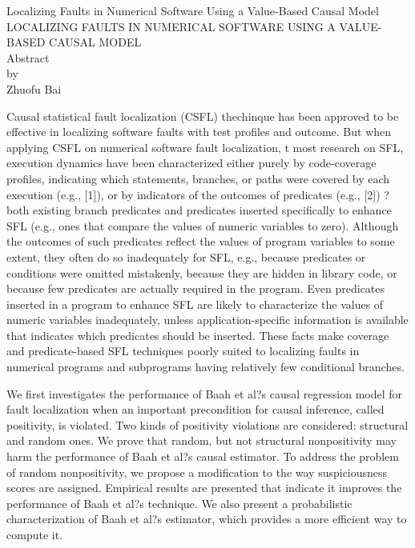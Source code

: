 \newpage
\begin{centering}
  Localizing Faults in Numerical Software Using a Value-Based Causal Model
  LOCALIZING FAULTS IN NUMERICAL SOFTWARE USING A VALUE-BASED CAUSAL MODEL\\
  \vspace{1cm}
  Abstract\\
  by\\
  \vspace{1cm}
  Zhuofu Bai\\
  \vspace{1cm}
\end{centering}



Causal statistical fault localization (CSFL) thechinque has been approved to be effective in localizing software faults with test profiles and outcome. But when applying CSFL on numerical software fault localization, t
 most research on SFL, execution dynamics have been characterized either purely by code-coverage profiles, indicating which statements, branches, or paths were covered by each execution (e.g., [1]), or by indicators of the outcomes of predicates (e.g., [2]) ? both existing branch predicates and predicates inserted specifically to enhance SFL (e.g., ones that compare the values of numeric variables to zero). Although the outcomes of such predicates reflect the values of program variables to some extent, they often do so inadequately for SFL, e.g., because predicates or conditions were omitted mistakenly, because they are hidden in library code, or because few predicates are actually required in the program. Even predicates inserted in a program to enhance SFL are likely to characterize the values of numeric variables inadequately, unless application-specific information is available that indicates which predicates should be inserted. These facts make coverage and predicate-based SFL techniques poorly suited to localizing faults in numerical programs and subprograms having relatively few conditional branches. 

We first investigates the performance of Baah et al?s causal regression model for fault localization when an important precondition for causal inference, called positivity, is violated.  Two kinds of positivity violations are considered: structural and random ones.  We prove that random, but not structural nonpositivity may harm the performance of Baah et al?s causal estimator.  To address the problem of random nonpositivity, we propose a modification to the way suspiciousness scores are assigned.  Empirical results are presented that indicate it improves the performance of Baah et al?s technique. We also present a probabilistic characterization of Baah et al?s estimator, which provides a more efficient way to compute it.

